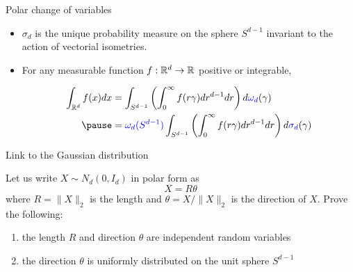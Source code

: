 \documentclass[handout, 10pt]{beamer} %
\begin{document}
  \begin{frame}{Polar change of variables}
    \begin{theorem}
      \begin{itemize}
      \item $\sigma_{d}$ is the unique probability measure on the sphere
        $S^{d-1}$ invariant to the action of vectorial isometries.

        \pause

      \item For any measurable function $f: \mathbb{R}^{d} \to \mathbb{R}$ positive or integrable,

        \begin{equation*}
          \begin{aligned}
            \int_{\R^{d}} f(x) d x &=\int_{S^{d-1}}\left(\int_{0}^{\infty} f(r \gamma) dr^{d-1} d r\right) d \textcolor{blue}{\omega_d}(\gamma) \\ \pause
            &= \textcolor{blue}{\omega_d(S^{d-1})} \int_{S^{d-1}}\left(\int_{0}^{\infty} f(r \gamma) dr^{d-1} d r\right) d \textcolor{blue}{\sigma_d}(\gamma)
          \end{aligned}
        \end{equation*}


      \end{itemize}

    \end{theorem}

  \end{frame}

  \begin{frame}{Link to the Gaussian distribution}
    \begin{proposition}[Exercise 3.3.7] Let us write $X \sim N_d\left(0, I_{d}\right)$ in
      polar  form as
      $$
      X=R \theta
      $$
      where $R=\|X\|_{2}$ is the length and $\theta=X /\|X\|_{2}$ is the direction
      of $X$. Prove the following:

      \pause

      \begin{enumerate}
      \item the length $R$ and direction $\theta$ are independent random
        variables
        \pause
      \item the direction $\theta$ is uniformly distributed on the unit sphere
        $S^{d-1}$
      \end{enumerate}
    \end{proposition}

  \end{frame}

\end{document}
